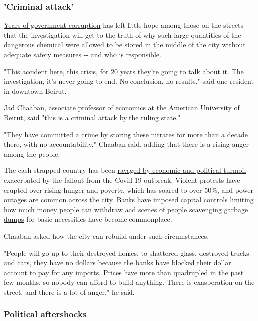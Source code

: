 \hypertarget{criminal-attack}{%
\subsubsection{'Criminal attack'}\label{criminal-attack}}

\href{https://www.cnn.com/2020/01/24/middleeast/lebanon-100-days-new-government-intl/index.html}{Years
of government corruption} has left little hope among those on the
streets that the investigation will get to the truth of why such large
quantities of the dangerous chemical were allowed to be stored in the
middle of the city without adequate safety measures -\/- and who is
responsible.

"This accident here, this crisis, for 20 years they're going to talk
about it. The investigation, it's never going to end. No conclusion, no
results," said one resident in downtown Beirut.

Jad Chaaban, associate professor of economics at the American University
of Beirut, said "this is a criminal attack by the ruling state."

"They have committed a crime by storing these nitrates for more than a
decade there, with no accountability," Chaaban said, adding that there
is a rising anger among the people.

The cash-strapped country has been
\href{https://www.cnn.com/2020/07/08/middleeast/lebanon-economy-crisis-intl/index.html}{ravaged
by economic and political turmoil} exacerbated by the fallout from the
Covid-19 outbreak. Violent protests have erupted over rising hunger and
poverty, which has soared to over 50\%, and power outages are common
across the city. Banks have imposed capital controls limiting how much
money people can withdraw and scenes of people
\href{https://www.cnn.com/2020/05/02/middleeast/lebanon-tripoli-hunger-protests-coronavirus-intl/index.html}{scavenging
garbage dumps} for basic necessities have become commonplace.

Chaaban asked how the city can rebuild under such circumstances.

"People will go up to their destroyed homes, to shattered glass,
destroyed trucks and cars, they have no dollars because the banks have
blocked their dollar account to pay for any imports. Prices have more
than quadrupled in the past few months, so nobody can afford to build
anything. There is exasperation on the street, and there is a lot of
anger," he said.

\hypertarget{political-aftershocks}{%
\subsubsection{Political aftershocks}\label{political-aftershocks}}

